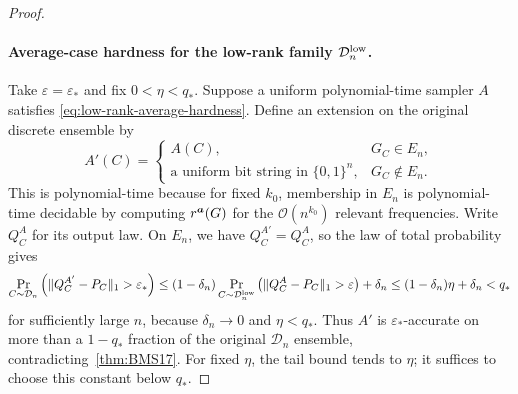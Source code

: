 \documentclass{article}
\theoremstyle{plain}
\theoremstyle{definition}
\theoremstyle{remark}
\begin{document}
\begin{proof}
\paragraph{Average-case hardness for the low-rank family $\mathcal{D}_n^{\rm low}$.}
Take $\varepsilon=\varepsilon_*$ and fix $0<\eta<q_*$.
Suppose a uniform polynomial-time sampler $A$ satisfies \cref{eq:low-rank-average-hardness}. Define an extension on the original
discrete ensemble by
$$
 A'(C)=
 \begin{cases}
  A(C), &G_C\in E_n,\\
  \text{a uniform bit string in }\{0,1\}^n, &G_C \notin E_n.
 \end{cases}
$$
This is polynomial-time because for fixed $k_0$, membership in $E_n$ is polynomial-time decidable by
computing $r^{{\bm{a}}}(G)$ for the $\mathcal{O}(n^{k_0})$ relevant frequencies.
Write $Q_C^A$ for its output law.
On $E_n$, we have $Q_C^{A'}=Q_C^A$, so the law of total probability gives
$$
\Pr_{C\sim\mathcal{D}_n}\left(\|Q_C^{A'}-P_C\|_1>\varepsilon_*\right) \leq (1-\delta_n)\Pr_{C\sim\mathcal{D}_n^{\rm low}}\left(\|Q_C^A-P_C\|_1 > \varepsilon\right) + \delta_n \leq(1-\delta_n)\eta+\delta_n < q_*
$$
for sufficiently large $n$, because $\delta_n\to0$ and $\eta<q_*$. Thus $A'$ is $\varepsilon_*$-accurate on more than a $1-q_*$ fraction
of the original $\mathcal{D}_n$ ensemble, contradicting~\cref{thm:BMS17}. For fixed $\eta$, the tail bound tends to $\eta$; it suffices to choose this constant below $q_*$. 


\end{proof}
\end{document}
